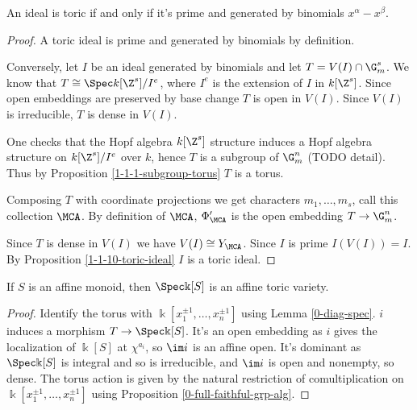 \begin{proposition}
  \label{1-1-11-toric-ideal-gen-binomial}

  An ideal is toric if and only if it's prime and generated by binomials $x^\alpha - x^\beta$.
\end{proposition}
\begin{proof}

  A toric ideal is prime and generated by binomials by definition.

  Conversely, let $I$ be an ideal generated by binomials and let $T = V(I) \cap \G_m^s$. We know that
  $T\cong \Spec k[\Z^s] / I^e$, where $I^e$ is the extension of $I$ in $k[\Z^s]$. Since open
  embeddings are preserved by base change $T$ is open in $V(I)$. Since $V(I)$ is irreducible,
  $T$ is dense in $V(I)$.

  One checks that the Hopf algebra $k[\Z^s]$ structure induces a Hopf algebra structure
  on $k[\Z^s] / I^e$ over $k$, hence $T$ is a subgroup of $\G_m^n$ (TODO detail). Thus by
  Proposition \ref{1-1-1-subgroup-torus} $T$ is a torus.

  Composing $T$ with coordinate projections we get characters $m_1,\dots,m_s$, call this collection $\MCA$.
  By definition of $\MCA$, $\Phi'_\MCA$ is the open embedding $T \to \G_m^n$.

  Since $T$ is dense in $V(I)$ we have $V(I) \cong Y_\MCA$. Since $I$ is prime $I(V(I)) = I$. By
  Proposition \ref{1-1-10-toric-ideal} $I$ is a toric ideal.
\end{proof}


\begin{proposition}
  \label{1-1-14-aff-tor-var-spec-aff-mon-alg}
  \leanok

  If $S$ is an affine monoid, then $\Spec \Bbbk[S]$ is an affine toric variety.
\end{proposition}
\begin{proof}

  Identify the torus with $\Bbbk[x_1^{\pm1}, \dotsc, x_n^{\pm1}]$ using Lemma \ref{0-diag-spec}.
  $i$ induces a morphism $T \to \Spec \Bbbk[S]$. It's an open embedding as $i$ gives the localization of $\Bbbk[S]$ at $\chi^{a_i}$, so $\im i$ is an affine open. It's dominant as $\Spec \Bbbk[S]$ is integral and so is irreducible, and $\im i$ is open and nonempty, so dense. The torus action is given by the natural restriction of comultiplication on $\Bbbk[x_1^{\pm1}, \dotsc, x_n^{\pm1}]$ using Proposition \ref{0-full-faithful-grp-alg}.
\end{proof}


